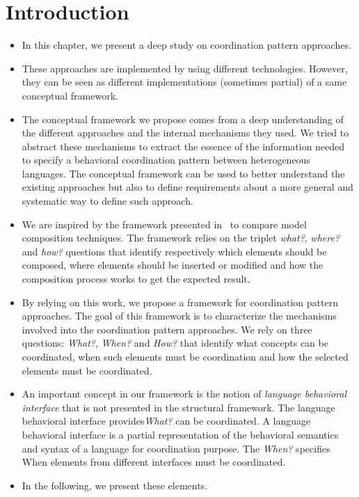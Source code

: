 \section{Introduction}
\begin{itemize}
\item In this chapter, we present a deep study on coordination pattern approaches. 

\item These approaches are implemented by using different technologies. However, they can be seen as different implementations (sometimes partial) of a same conceptual framework.

\item The conceptual framework we propose comes from a deep understanding of the different approaches and the internal mechanisms they used. We tried to abstract these mechanisms to extract the essence of the information needed to specify a behavioral coordination pattern between heterogeneous languages. The conceptual framework can be used to better understand the existing approaches but also to define requirements about a more general and systematic way to define such approach.


\item We are inspired by the framework presented in~\cite{framecompoas} to compare model
composition techniques. The framework relies on the triplet \emph{what?}, \emph{where?} and \emph{how?} questions that identify respectively which elements should be composed, where elements should be inserted or modified and how the composition process works to get the expected result. 


\item By relying on this work, we propose a framework for coordination pattern approaches. The goal of this framework is to characterize the mechanisms involved into the coordination pattern approaches. We rely on three questions: \emph{What?}, \emph{When?} and \emph{How?} that identify what concepts can be coordinated, when such elements must be coordination and how the selected elements must be coordinated.   
 
\item An important concept in our framework is the notion of \emph{language behavioral interface} that is not presented in the structural framework. The language behavioral interface provides\emph{What?} can be coordinated. A language behavioral interface is a partial representation of the behavioral semantics and syntax of a language for coordination purpose. The \emph{When?} specifies When elements from different interfaces must be coordinated. 


\item In the following, we present these elements.     
	
\end{itemize}
